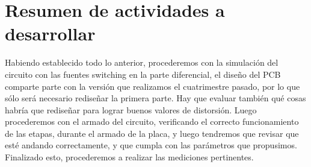 \documentclass[a4paper,12pt,twoside]{article}
\begin{document}
\section{Resumen de actividades a desarrollar}

Habiendo establecido todo lo anterior, procederemos con la simulación del circuito con las fuentes switching en la parte diferencial, el diseño del PCB comparte parte con la versión que realizamos el cuatrimestre pasado, por lo que sólo será necesario rediseñar la primera parte. Hay que evaluar también qué cosas habría que rediseñar para lograr buenos valores de distorsión. Luego procederemos con el armado del circuito, verificando el correcto funcionamiento de las etapas, durante el armado de la placa, y luego tendremos que revisar que esté andando correctamente, y que cumpla con las parámetros que propusimos. Finalizado esto, procederemos a realizar las mediciones pertinentes.
\end{document}
